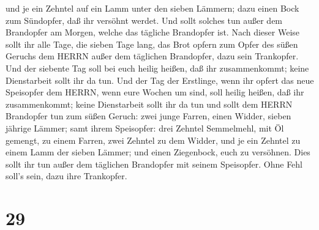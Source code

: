 und je ein Zehntel auf ein Lamm unter den sieben Lämmern; 
dazu einen Bock zum Sündopfer, daß ihr versöhnt werdet. 
Und sollt solches tun außer dem Brandopfer am Morgen, welche das
tägliche Brandopfer ist.  Nach dieser Weise sollt ihr alle
Tage, die sieben Tage lang, das Brot opfern zum Opfer des süßen Geruchs
dem HERRN außer dem täglichen Brandopfer, dazu sein Trankopfer.
 Und der siebente Tag soll bei euch heilig heißen, daß ihr
zusammenkommt; keine Dienstarbeit sollt ihr da tun.  Und
der Tag der Erstlinge, wenn ihr opfert das neue Speisopfer dem HERRN,
wenn eure Wochen um sind, soll heilig heißen, daß ihr zusammenkommt;
keine Dienstarbeit sollt ihr da tun  und sollt dem HERRN
Brandopfer tun zum süßen Geruch: zwei junge Farren, einen Widder, sieben
jährige Lämmer;  samt ihrem Speisopfer: drei Zehntel
Semmelmehl, mit Öl gemengt, zu einem Farren, zwei Zehntel zu dem Widder,
 und je ein Zehntel zu einem Lamm der sieben Lämmer;
 und einen Ziegenbock, euch zu versöhnen. 
Dies sollt ihr tun außer dem täglichen Brandopfer mit seinem Speisopfer.
Ohne Fehl soll's sein, dazu ihre Trankopfer.

\hypertarget{section-28}{%
\section{29}\label{section-28}}

